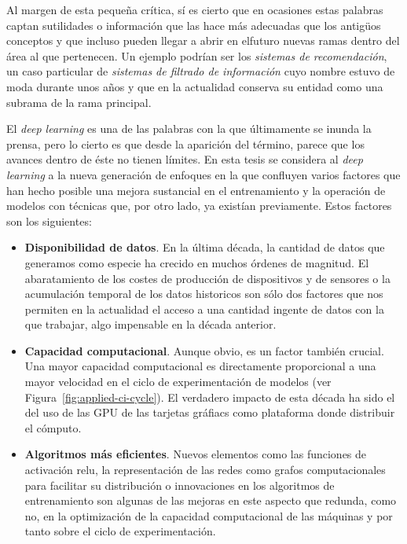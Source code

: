 Al margen de esta pequeña crítica, sí es cierto que en ocasiones estas palabras captan sutilidades o información que las hace más adecuadas que los antigüos conceptos y que incluso pueden llegar a abrir en elfuturo nuevas ramas dentro del área al que pertenecen. Un ejemplo podrían ser los \textit{sistemas de recomendación}, un caso particular de \textit{sistemas de filtrado de información} cuyo nombre estuvo de moda durante unos años y que en la actualidad conserva su entidad como una subrama de la rama principal.

El \textit{deep learning} es una de las palabras con la que últimamente se inunda la prensa, pero lo cierto es que desde la aparición del término, parece que los avances dentro de éste no tienen límites. En esta tesis se considera al \textit{deep learning} a la nueva generación de enfoques en la que confluyen varios factores que han hecho posible una mejora sustancial en el entrenamiento y la operación de modelos con técnicas que, por otro lado, ya existían previamente. Estos factores son los siguientes:

\begin{itemize}
	\item \textbf{Disponibilidad de datos}. En la última década, la cantidad de datos que generamos como especie ha crecido en muchos órdenes de magnitud. El abaratamiento de los costes de producción de dispositivos y de sensores o la acumulación temporal de los datos historicos son sólo dos factores que nos permiten en la actualidad el acceso a una cantidad ingente de datos con la que trabajar, algo impensable en la década anterior.
	\item \textbf{Capacidad computacional}. Aunque obvio, es un factor también crucial. Una mayor capacidad computacional es directamente proporcional a una mayor velocidad en el ciclo de experimentación de modelos (ver Figura~\ref{fig:applied-ci-cycle}). El verdadero impacto de esta década ha sido el del uso de las GPU de las tarjetas gráfiacs como plataforma donde distribuir el cómputo.
	\item \textbf{Algoritmos más eficientes}. Nuevos elementos como las funciones de activación \gls{relu}, la representación de las redes como grafos computacionales para facilitar su distribución o innovaciones en los algoritmos de entrenamiento son algunas de las mejoras en este aspecto que redunda, como no, en la optimización de la capacidad computacional de las máquinas y por tanto sobre el ciclo de experimentación.
\end{itemize}

